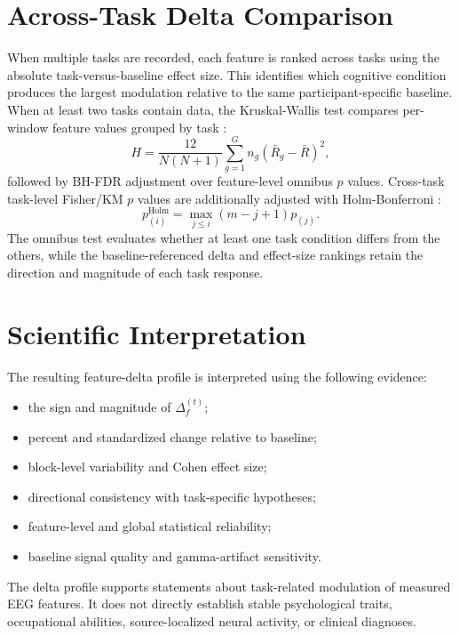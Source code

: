 \documentclass[conference]{IEEEtran}
\begin{document}
\section{Across-Task Delta Comparison}
When multiple tasks are recorded, each feature is ranked across tasks using the absolute task-versus-baseline effect size. This identifies which cognitive condition produces the largest modulation relative to the same participant-specific baseline. When at least two tasks contain data, the Kruskal-Wallis test compares per-window feature values grouped by task \cite{kruskal1952}:
\begin{equation}
H=\frac{12}{N(N+1)}\sum_{g=1}^{G}n_g(\bar{R}_g-\bar{R})^2 ,
\end{equation}
followed by BH-FDR adjustment over feature-level omnibus $p$ values. Cross-task task-level Fisher/KM $p$ values are additionally adjusted with Holm-Bonferroni \cite{holm1979}:
\begin{equation}
p_{(i)}^{\mathrm{Holm}}=\max_{j\le i}(m-j+1)p_{(j)}.
\end{equation}
The omnibus test evaluates whether at least one task condition differs from the others, while the baseline-referenced delta and effect-size rankings retain the direction and magnitude of each task response.

\section{Scientific Interpretation}
The resulting feature-delta profile is interpreted using the following evidence:
\begin{itemize}
\item the sign and magnitude of $\Delta_f^{(t)}$;
\item percent and standardized change relative to baseline;
\item block-level variability and Cohen effect size;
\item directional consistency with task-specific hypotheses;
\item feature-level and global statistical reliability;
\item baseline signal quality and gamma-artifact sensitivity.
\end{itemize}

The delta profile supports statements about task-related modulation of measured EEG features. It does not directly establish stable psychological traits, occupational abilities, source-localized neural activity, or clinical diagnoses.
\end{document}
